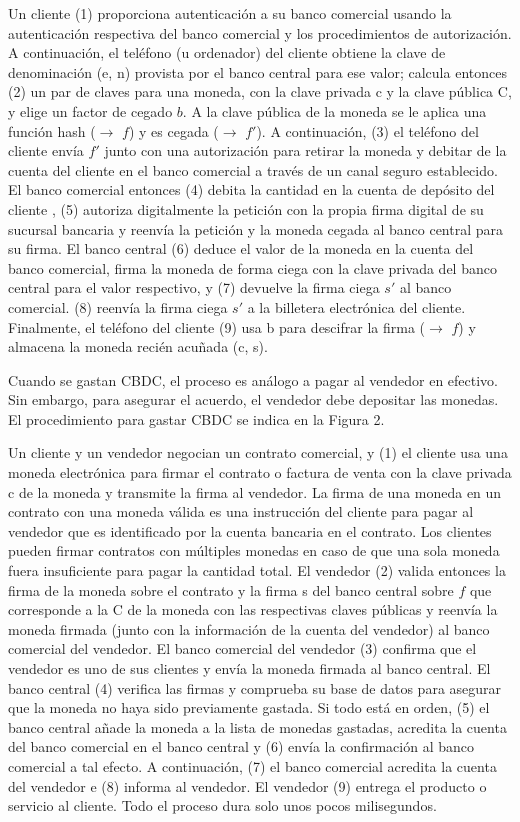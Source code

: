 \documentclass[10pt,spanish]{article}
\begin{document}
Un cliente (1) proporciona autenticación a su banco comercial usando la
autenticación respectiva del banco comercial y los procedimientos de
autorización. A continuación, el teléfono (u ordenador) del cliente
obtiene la clave de denominación (e, n) provista por el banco central
para ese valor; calcula entonces (2) un par de claves para una moneda,
con la clave privada c y la clave pública C, y elige un factor de cegado
$b$. A la clave pública de la moneda se le aplica una función hash
($\to$ $f$) y es cegada ($\to$ $f'$). A continuación, (3) el teléfono
del cliente envía $f'$ junto con una autorización para retirar la
moneda y debitar de la cuenta del cliente en el banco comercial a través
de un canal seguro establecido. El banco comercial entonces (4) debita
la cantidad en la cuenta de depósito del cliente , (5) autoriza
digitalmente la petición con la propia firma digital de su sucursal
bancaria y reenvía la petición y la moneda cegada al banco central para
su firma. El banco central (6) deduce el valor de la moneda en la cuenta
del banco comercial, firma la moneda de forma ciega con la clave privada
del banco central para el valor respectivo, y (7) devuelve la firma
ciega $s'$ al banco comercial. (8) reenvía la firma ciega $s'$
a la billetera electrónica del cliente. Finalmente, el teléfono del
cliente (9) usa b para descifrar la firma ($\to$ $f$) y almacena la
moneda recién acuñada (c, s).

Cuando se gastan CBDC, el proceso es análogo a pagar al vendedor en
efectivo. Sin embargo, para asegurar el acuerdo, el vendedor debe
depositar las monedas. El procedimiento para gastar CBDC se indica en la
Figura 2.

Un cliente y un vendedor negocian un contrato comercial, y (1) el
cliente usa una moneda electrónica para firmar el contrato o factura de
venta con la clave privada c de la moneda y transmite la firma al
vendedor. La firma de una moneda en un contrato con una moneda válida es
una instrucción del cliente para pagar al vendedor que es identificado
por la cuenta bancaria en el contrato. Los clientes pueden firmar
contratos con múltiples monedas en caso de que una sola moneda fuera
insuficiente para pagar la cantidad total. El vendedor (2) valida
entonces la firma de la moneda sobre el contrato y la firma s del banco
central sobre $f$ que corresponde a la C de la moneda con las
respectivas claves públicas y reenvía la moneda firmada (junto con la
información de la cuenta del vendedor) al banco comercial del vendedor.
El banco comercial del vendedor (3) confirma que el vendedor es uno de
sus clientes y envía la moneda firmada al banco central. El banco
central (4) verifica las firmas y comprueba su base de datos para
asegurar que la moneda no haya sido previamente gastada. Si todo está en
orden, (5) el banco central añade la moneda a la lista de monedas
gastadas, acredita la cuenta del banco comercial en el banco central y
(6) envía la confirmación al banco comercial a tal efecto. A
continuación, (7) el banco comercial acredita la cuenta del vendedor e
(8) informa al vendedor. El vendedor (9) entrega el producto o servicio
al cliente. Todo el proceso dura solo unos pocos milisegundos.
\end{document}
